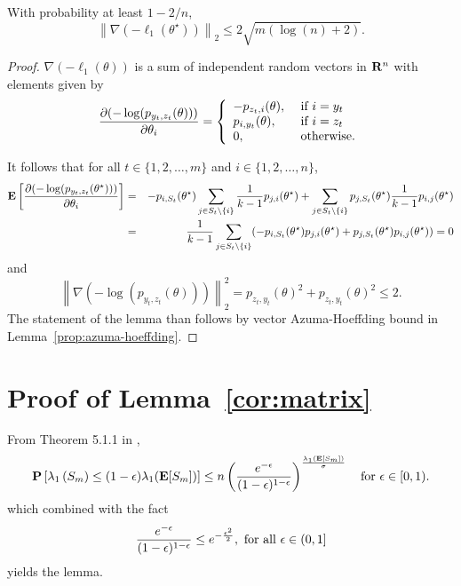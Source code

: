 
\begin{lemma} With probability at least $1-2/n$,
\begin{equation}
\left\| \nabla(-\ell_1(\theta^\star)) \right\|_2  
\le  2\sqrt{m (\log (n)+2)}.
\label{eq:2-azu}
\end{equation}
\label{lem:breakk1nabla}
\end{lemma}

\begin{proof} $\nabla (-\ell_1(\theta))$ is a sum of independent random vectors in $\mathbf{R}^n$ with elements given by
$$
\frac{\partial (-\log(p_{y_t,z_t}(\theta)))}{\partial \theta_i} = \left\{
\begin{array}{ll}
-p_{z_t,i}(\theta), & \hbox{ if } i = y_t\\
p_{i,y_t}(\theta), & \hbox{ if } i = z_t\\
0, & \hbox{ otherwise}.
\end{array}
\right .
$$

It follows that for all $t\in \{1,2,\ldots,m\}$ and $i\in \{1,2,\ldots,n\}$,
\begin{eqnarray*}
\mathbf{E}\left[\frac{\partial (-\log(p_{y_t,z_t}(\theta^\star)))}{\partial \theta_i}\right] 
&=& -p_{i,S_t}(\theta^\star) \sum_{j\in S_t \setminus\{ i\}} \frac{1}{k-1}p_{j,i}(\theta^\star) + 
\sum_{j\in S_t \setminus\{ i\}} p_{j,S_t}(\theta^\star)\frac{1}{k-1}p_{i,j}(\theta^\star)\\
&=& \frac{1}{k-1}\sum_{j\in S_t\setminus\{i\}} (-p_{i,S_t}(\theta^\star)p_{j,i}(\theta^\star) + p_{j,S_t}(\theta^\star)p_{i,j}(\theta^\star)) = 0
\end{eqnarray*}
and
\begin{equation}
\left\|\nabla (-\log(p_{y_t,z_t}(\theta)))\right\|_2^2 = p_{z_t,y_t}(\theta)^2 + p_{z_t,y_t}(\theta)^2 \le  2.
\end{equation}
The statement of the lemma than follows by vector Azuma-Hoeffding bound in Lemma~\ref{prop:azuma-hoeffding}.
\end{proof}

\section{Proof of Lemma~\ref{cor:matrix}}

From Theorem 5.1.1 in \cite{tropp2015introduction},
\begin{equation}
\mathbf{P}\left[ \lambda_{1}\left(S_m\right) \le
  (1-\epsilon) \lambda_1(\mathbf{E}[S_m]) \right]
	\le n
  \left(\frac{e^{-\epsilon}}{(1-\epsilon)^{1-\epsilon}}
  \right)^{\frac{\lambda_1(\mathbf{E}[S_m])}{\sigma}}\quad\mbox{for}~\epsilon\in [0,1).\label{equ:pro2}
\end{equation}
which combined with the fact
$$
\frac{e^{-\epsilon}}{(1-\epsilon)^{1-\epsilon}} \leq e^{-\frac{\epsilon^2}{2}}, \hbox{ for all } \epsilon \in (0,1]
$$
yields the lemma.


